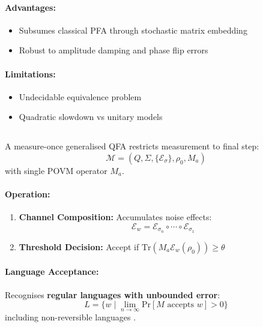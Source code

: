 \paragraph{Advantages:}
\begin{itemize}
    \item Subsumes classical PFA through stochastic matrix embedding
    \item Robust to amplitude damping and phase flip errors
\end{itemize}

\paragraph{Limitations:}
\begin{itemize}
    \item Undecidable equivalence problem \cite{blondel2003equivalence}
    \item Quadratic slowdown vs unitary models
\end{itemize}

\subsection{}
\label{subsec:mo-1gqfa}

\begin{definition}
A measure-once generalised QFA restricts measurement to final step:
\[
\mathcal{M} = (Q, \Sigma, \{\mathcal{E}_\sigma\}, \rho_0, M_a)
\]
with single POVM operator $M_a$.
\end{definition}

\paragraph{Operation:}
\begin{enumerate}
    \item \textbf{Channel Composition:} Accumulates noise effects:
    \[
    \mathcal{E}_w = \mathcal{E}_{\sigma_n} \circ \cdots \circ \mathcal{E}_{\sigma_1}
    \]
    \item \textbf{Threshold Decision:} Accept if $\text{Tr}(M_a\mathcal{E}_w(\rho_0)) \geq \theta$
\end{enumerate}

\paragraph{Language Acceptance:}
Recognises \textbf{regular languages with unbounded error}:
\[
L = \{w \mid \lim_{n\to\infty} \text{Pr}[M \text{ accepts } w] > 0\}
\]
including non-reversible languages \cite{hirvensalo2012quantum}.

